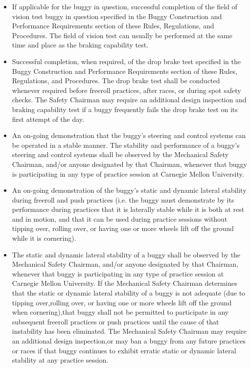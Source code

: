 \begin{itemize}
	\item
	If applicable for the buggy in question, successful completion of the field of vision test buggy in question specified in the Buggy Construction and Performance Requirements section of these Rules, Regulations, and Procedures. The field of vision test can usually be performed at the same time and place as the braking capability test. 
	\item
	Successful completion, when required, of the drop brake test specified in the Buggy Construction and Performance Requirements section of these Rules, Regulations, and Procedures. The drop brake test shall be conducted whenever required before freeroll practices, after races, or during spot safety checks. The Safety Chairman may require an additional design inspection and braking capability test if a buggy frequently fails the drop brake test on its first attempt of the day.
	\item
	An on-going demonstration that the buggy's steering and control systems can be operated in a stable manner. The stability and performance of a buggy's steering and control systems shall be observed by the Mechanical Safety Chairman, and/or anyone designated by that Chairman, whenever that buggy is participating in any type of practice session at Carnegie Mellon University.
	\item
	An on-going demonstration of the buggy's static and dynamic lateral stability during freeroll and push practices (i.e. the buggy must demonstrate by its performance during practices that it is laterally stable while it is both at rest and in motion, and that it can be used during practice sessions without tipping over, rolling over, or having one or more wheels lift off the ground while it is cornering).
	\item
	The static and dynamic lateral stability of a buggy shall be observed by the Mechanical Safety Chairman, and/or anyone designated by that Chairman, whenever that buggy is participating in any type of practice session at Carnegie Mellon University. If the Mechanical Safety Chairman determines that the static or dynamic lateral stability of a buggy is not adequate (due to tipping over,rolling over, or having one or more wheels lift off the ground when cornering),that buggy shall not be permitted to participate in any subsequent freeroll practices or push practices until the cause of that instability has been eliminated. The Mechanical Safety Chairman may require an additional design inspection,or may ban a buggy from any future practices or races if that buggy continues to exhibit erratic static or dynamic lateral stability at any practice session.

\end{itemize}
